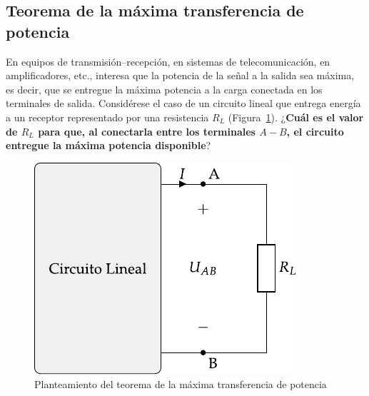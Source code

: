     
    
    
    

\subsection{Teorema de la máxima transferencia de potencia}
En equipos de transmisión--recepción, en sistemas de telecomunicación, en amplificadores, etc., interesa que la potencia de la señal a la salida sea máxima, es decir, que se entregue la máxima potencia a la carga conectada en los terminales de salida. Considérese el caso de un circuito lineal que entrega energía a un receptor representado por una resistencia $R_L$ (Figura~\ref{fig.planteamiento_mtp_cc}). ¿\textbf{Cuál es el valor de $R_L$ para que, al conectarla entre los terminales $A-B$, el circuito entregue la máxima potencia disponible}?
\begin{figure}[H]
    \centering
    \includegraphics[width=0.35\linewidth]{../figs/thevenin_continua_red.pdf}
    \caption{Planteamiento del teorema de la máxima transferencia de potencia}
    \label{fig.planteamiento_mtp_cc}
\end{figure}

